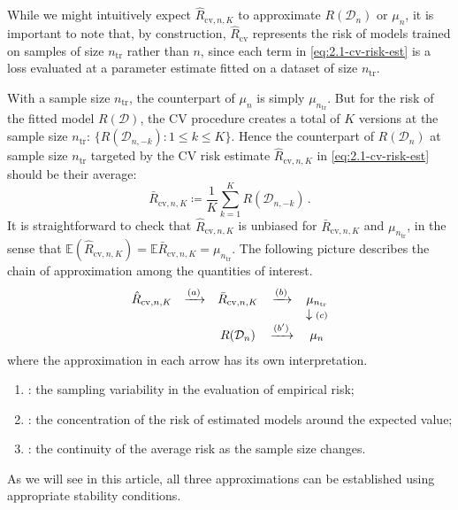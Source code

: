 \documentclass[11pt]{article}
\theoremstyle{plain}
\newcommand{\cv}{{\mathrm{cv}}}
\newcommand{\tr}{{\mathrm{tr}}}
\newcommand{\D}{{\mathcal{D}}}
\begin{document}
While we might intuitively expect $\hat R_{\cv,n,K}$ to approximate $R(\D_n)$ or $\mu_n$, it is important to note that, by construction, $\hat R_{\cv}$ represents the risk of models trained on samples of size $n_\tr$ rather than $n$, since each term in \eqref{eq:2.1-cv-risk-est} is a loss evaluated at a parameter estimate fitted on a dataset of size $n_\tr$.

With a sample size $n_\tr$, the counterpart of $\mu_n$ is simply $\mu_{n_\tr}$.  But for the risk of the fitted model $R(\D)$, the CV procedure creates a total of $K$ versions at the sample size $n_\tr$: $\{R(\D_{n,-k}):1\le k\le K\}$.  Hence the counterpart of $R(\D_n)$ at  sample size $n_\tr$ targeted by the CV risk estimate $\hat R_{\cv,n,K}$ in \eqref{eq:2.1-cv-risk-est} should be their average:
\begin{equation}\label{eq:2.1-R-bar}
\bar R_{\cv,n,K} \coloneqq \frac{1}{K}\sum_{k=1}^K R(\D_{n,-k})\,.
\end{equation}
It is straightforward to check that $\hat R_{\cv,n,K}$ is unbiased for $\bar R_{\cv, n,K}$ and $\mu_{n_\tr}$, in the sense that $\mathbb E(\hat R_{\cv,n,K}) = \mathbb E \bar R_{\cv, n,K}=\mu_{n_\tr}$.  
The following picture describes the chain of approximation among the quantities of interest.
\begin{equation}
    \label{eq:cv_graph}
    \begin{array}{ccccc}
       \hat R_{\cv,n,K}  & \xrightarrow{(a)} & \bar R_{\cv, n,K} & \xrightarrow{(b)} & \mu_{n_\tr}\\
       &  &  & & \downarrow\text{\scriptsize $(c)$} \\
       & & R(\D_n) &\xrightarrow{(b')} & \mu_n
    \end{array}
\end{equation}
where the approximation in each arrow has its own interpretation.
\begin{enumerate}
    \item [(a)]: the sampling variability in the evaluation of empirical risk;
    \item [(b,b$'$)]: the concentration of the risk of estimated models around the expected value;
    \item [(c)]: the continuity of the average risk as the sample size changes.
\end{enumerate}
As we will see in this article, all three approximations can be established using appropriate stability conditions.

\end{document}
